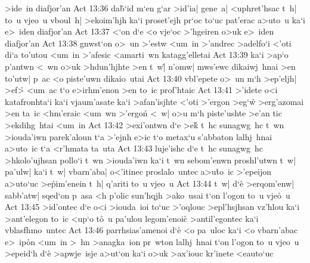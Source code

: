 >ide~in
diafjor'an\bibvsend
\vs Act 13:36
da\r{b}`id
m`en
g`ar
>id'ia|
gene~a|
<uphret'hsac
t~h|
to~u
vjeo~u
vboul~h|
>ekoim'hjh
ka`i
proset'ejh
pr`oc
to`uc
pat'erac
a>uto~u
ka`i
e>~iden
diafjor'an\bibvsend
\vs Act 13:37
<`on
d`e
<o
vje`oc
>'hgeiren
o>uk
e>~iden
diafjor'an\bibvsend
\vs Act 13:38
gnwst`on
o>~un
>'estw
<um~in
>'andrec
>adelfo`i
<'oti
di`a
to'utou
<um~in
>'afesic
<amarti~wn
katagg'elletai\bibvsend
\vs Act 13:39
ka`i
>ap`o
p'antwn
<~wn
o>uk
>hdun'hjhte
>en
t~w|\r{}
n'omw|
mws'ewc
dikaiwj~hnai
>en
to'utw|
p~ac
<o
piste'uwn
dikaio~utai\bibvsend
\vs Act 13:40
vbl'epete
o>~un
m`h
>ep'eljh|
>ef>\r{}
<um~ac
t`o
e>irhm'enon
>en
to~ic
prof'htaic\bibvsend
\vs Act 13:41
>'idete
o<i
katafronhta`i
ka`i
vjaum'asate
ka`i
>afan'isjhte
<'oti
>'ergon
>eg`w\r{}
>erg'azomai
>en
ta~ic
<hm'eraic
<um~wn
>'ergon\r{}
<~w|
o>u
m`h
piste'ushte
>e'an
tic
>ekdihg~htai
<um~in\bibvsend
\vs Act 13:42
>exi'ontwn
d`e
>ek\r{}
t~hc
sunagwg~hc
t~wn
>iouda'iwn
parek'aloun
t`a
>'ejnh
e>ic
t`o
metax`u
s'abbaton
lalhj~hnai
a>uto~ic
t`a
<r'hmata
ta~uta\bibvsend
\vs Act 13:43
luje'ishc
d`e
t~hc
sunagwg~hc
>hkolo'ujhsan
pollo`i
t~wn
>iouda'iwn
ka`i
t~wn
sebom'enwn
proshl'utwn
t~w|
pa'ulw|
ka`i
t~w|
vbarn'aba|
o<'itinec
proslalo~untec
a>u\r{t}o~ic
>'epeijon
a>uto`uc
>e\r{p}im'enein
t~h|
q'ariti
to~u
vjeo~u\bibvsend
\vs Act 13:44
t~w|
d`e\r{}
>erqom'enw|
sabb'atw|
sqed`on
p~asa
<h
p'olic
sun'hqjh
>ako~usai
t`on
l'ogon
to~u
vje\r{o}~u\bibvsend
{}
\vs Act 13:45
>id'ontec
d`e
o<i
>iouda~ioi
to`uc
>'oqlouc
>epl'hsjhsan
vz'hlou
ka`i
>ant'elegon
to~ic
<up`o
t\r{o}~u
pa'ulou
legom'enoic\r{}
>antil'egontec
ka`i
vblasfhmo~untec\bibvsend
\vs Act 13:46
parrhsias'amenoi
d`e\r{}
<o
pa~uloc
ka`i
<o
vbarn'abac
e>~ip\r{o}n
<um~in
>~hn
>anagka~ion
pr~wton
lalhj~hnai
t`on
l'ogon
to~u
vjeo~u
>epeid`h
d`e\r{}
>apwje~isje
a>ut`on
ka`i
o>uk
>ax'iouc
kr'inete
<eauto`uc
